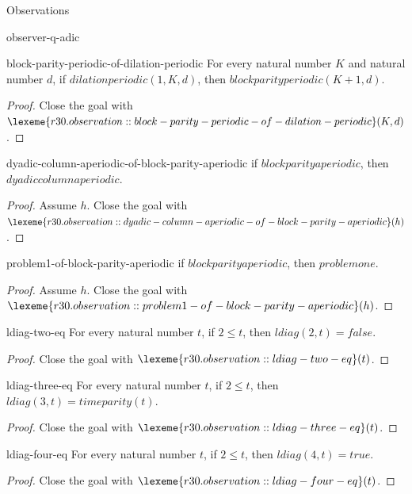 \begin{lexlean}{Observations}
\begin{section}{observer-q-adic}
\begin{theorem}{block-parity-periodic-of-dilation-periodic}
For every natural number \(K\) and natural number \(d\), if \(dilationperiodic(1, K, d)\), then \(blockparityperiodic(K + 1, d)\).
\begin{proof}
Close the goal with \(\lexeme{r30.observation::block-parity-periodic-of-dilation-periodic}(K, d)\).
\end{proof}
\end{theorem}

\begin{theorem}{dyadic-column-aperiodic-of-block-parity-aperiodic}
if \(blockparityaperiodic\), then \(dyadiccolumnaperiodic\).
\begin{proof}
Assume \(h\).
Close the goal with \(\lexeme{r30.observation::dyadic-column-aperiodic-of-block-parity-aperiodic}(h)\).
\end{proof}
\end{theorem}

\begin{theorem}{problem1-of-block-parity-aperiodic}
if \(blockparityaperiodic\), then \(problemone\).
\begin{proof}
Assume \(h\).
Close the goal with \(\lexeme{r30.observation::problem1-of-block-parity-aperiodic}(h)\).
\end{proof}
\end{theorem}

\begin{theorem}{ldiag-two-eq}
For every natural number \(t\), if \(2 ≤ t\), then \(ldiag(2, t) = false\).
\begin{proof}
Close the goal with \(\lexeme{r30.observation::ldiag-two-eq}(t)\).
\end{proof}
\end{theorem}

\begin{theorem}{ldiag-three-eq}
For every natural number \(t\), if \(2 ≤ t\), then \(ldiag(3, t) = timeparity(t)\).
\begin{proof}
Close the goal with \(\lexeme{r30.observation::ldiag-three-eq}(t)\).
\end{proof}
\end{theorem}

\begin{theorem}{ldiag-four-eq}
For every natural number \(t\), if \(2 ≤ t\), then \(ldiag(4, t) = true\).
\begin{proof}
Close the goal with \(\lexeme{r30.observation::ldiag-four-eq}(t)\).
\end{proof}
\end{theorem}


\end{section}
\end{lexlean}
